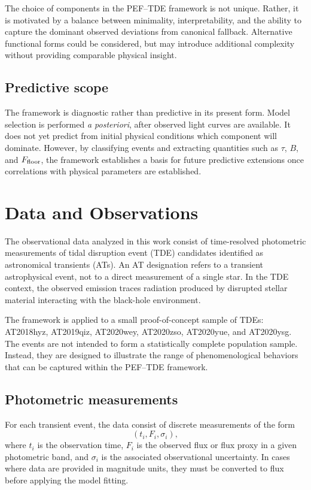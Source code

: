 \documentclass[11pt]{article}
\begin{document}
The choice of components in the PEF--TDE framework is not unique. Rather, it is motivated by a balance between minimality, interpretability, and the ability to capture the dominant observed deviations from canonical fallback. Alternative functional forms could be considered, but may introduce additional complexity without providing comparable physical insight.


\subsection{Predictive scope}
The framework is diagnostic rather than predictive in its present form. Model selection is performed \textit{a posteriori}, after observed light curves are available. It does not yet predict from initial physical conditions which component will dominate. However, by classifying events and extracting quantities such as $\tau$, $B$, and $F_{\rm floor}$, the framework establishes a basis for future predictive extensions once correlations with physical parameters are established.

\section{Data and Observations}
The observational data analyzed in this work consist of time-resolved photometric measurements of tidal disruption event (TDE) candidates identified as astronomical transients (ATs). An AT designation refers to a transient astrophysical event, not to a direct measurement of a single star. In the TDE context, the observed emission traces radiation produced by disrupted stellar material interacting with the black-hole environment.

The framework is applied to a small proof-of-concept sample of TDEs: AT2018hyz, AT2019qiz, AT2020wey, AT2020zso, AT2020yue, and AT2020ysg. The events are not intended to form a statistically complete population sample. Instead, they are designed to illustrate the range of phenomenological behaviors that can be captured within the PEF--TDE framework.

\subsection{Photometric measurements}
For each transient event, the data consist of discrete measurements of the form
\begin{equation}
(t_i,F_i,\sigma_i),
\end{equation}
where $t_i$ is the observation time, $F_i$ is the observed flux or flux proxy in a given photometric band, and $\sigma_i$ is the associated observational uncertainty. In cases where data are provided in magnitude units, they must be converted to flux before applying the model fitting.
\end{document}
